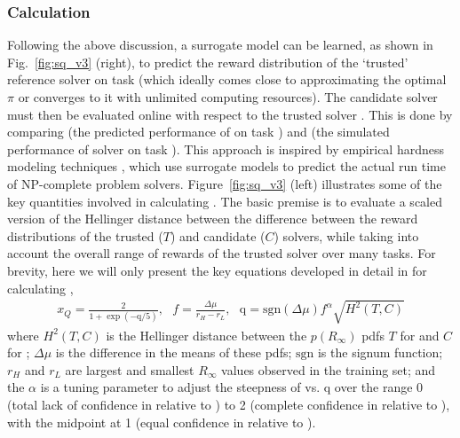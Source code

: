 \subsubsection{Calculation} \label{sec:methodology}
Following the above discussion, a surrogate model \surrogate{} can be learned,  as shown in Fig.~\ref{fig:sq_v3} (right), to predict the reward distribution \rwdstarapprox{} of the `trusted' reference solver \solvestar{} on task \task{} (which ideally comes close to approximating the optimal $\pi$ or converges to it with unlimited computing resources). The candidate solver \solve{} must then be evaluated online with respect to the trusted solver \solvestar{}. This is done by comparing \rwdstarapprox{} (the predicted performance of \solvestar{} on task \task) and \rwd{} (the simulated performance of solver \solve{} on task \task). %
This approach is inspired by empirical hardness modeling techniques \cite{Leyton-Brown2009-yr}, which use surrogate models to predict the actual run time of NP-complete problem solvers. 
Figure~\ref{fig:sq_v3} (left) illustrates some of the key quantities involved in calculating \xQ{}. The basic premise is to evaluate a scaled version of the Hellinger distance between the difference between the reward distributions of the trusted ($T$) and candidate ($C$) solvers, while taking into account the overall range of rewards of the trusted solver over many tasks. %
For brevity, here we will only present the key equations developed in detail in \cite{Israelsen2018-qz} for calculating \xQ{}, 
\begin{align}
    x_{Q} = \frac{2}{1+\exp(-\text{q}/5)}, \ \ \
    f = \frac{\Delta \mu}{r_H - r_L}, \ \ \
    \text{q} = \text{sgn}(\Delta \mu)f^{\alpha}\sqrt{H^{2}(T,C)} \label{eq:SQ} %
\end{align}
where $H^2(T,C)$ is the Hellinger distance between the $p(R_{\infty})$ pdfs $T$ for \solvestar{} and $C$ for \solve{}; $\Delta \mu$ is the difference in the means of these pdfs; $\mbox{sgn}$ is the signum function; $r_H$ and $r_L$ are largest and smallest $R_{\infty}$ values observed in the \solvestar{} training set; and the $\alpha$ is a tuning parameter to adjust the steepness
of \xQ{} vs. q over the range 0 (total lack of confidence in \solve{} relative to \solvestar{}) to 2 (complete confidence in \solve{} relative to \solvestar{}), with the midpoint at 1 (equal confidence in \solve{} relative to \solvestar{}). 

